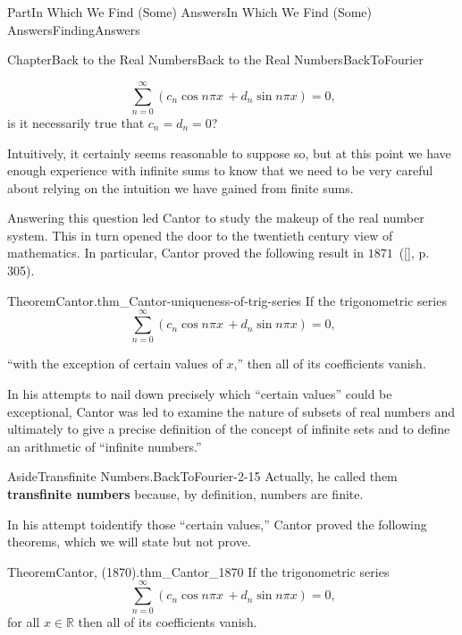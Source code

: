 \documentclass[oneside,10pt,]{book}
\newcommand{\xreffont}{\relax}
\newcommand{\terminology}[1]{\textbf{#1}}
\numberwithin{equation}{part}
\newcommand{\RR}{\mathbb {R}}
\begin{document}
\begin{partptx}{Part}{In Which We Find (Some) Answers}{}{In Which We Find (Some) Answers}{}{}{FindingAnswers}
\begin{chapterptx}{Chapter}{Back to the Real Numbers}{}{Back to the Real Numbers}{}{}{BackToFourier}
\begin{introduction}{}
\begin{equation*}
\sum_{n=0}^\infty\left(c_n\cos n\pi x\,+d_n\sin n\pi
x\right) = 0\text{,}
\end{equation*}
is it necessarily true that \(c_n=d_n=0\)?%
\par
Intuitively, it certainly seems reasonable to suppose so, but at this point we have enough experience with infinite sums to know that we need to be very careful about relying on the intuition we have gained from finite sums.%
\par
Answering this question led Cantor to study the makeup of the real number system.  This in turn opened the door to the twentieth century view of mathematics.  In particular, Cantor proved the following result in \(1871\)~(\hyperlink{jahnke03__histor_analy}{[{\xreffont 6}]}, p. 305).%
\begin{theorem}{Theorem}{Cantor.}{}{thm_Cantor-uniqueness-of-trig-series}%
%
%
%
If the trigonometric series%
\begin{equation*}
\sum_{n=0}^\infty\left(c_n\cos n\pi  x\,+d_n\sin n\pi x\right) = 0\text{,}
\end{equation*}
%
\par
``with the exception of certain values of \(x\),'' then all of its coefficients vanish.%
\end{theorem}
In his attempts to nail down precisely which ``certain values'' could be exceptional, Cantor was led to examine the nature of subsets of real numbers and ultimately to give a precise definition of the concept of infinite sets and to define an arithmetic of ``infinite numbers.''%
\begin{aside}{Aside}{Transfinite Numbers.}{BackToFourier-2-15}%
Actually, he called them \terminology{transfinite numbers} because, by definition, numbers are finite.%
\end{aside}
In his attempt toidentify those ``certain values,'' Cantor proved the following theorems, which we will state but not prove.%
\begin{theorem}{Theorem}{Cantor, (1870).}{}{thm_Cantor_1870}%
%
%
If the trigonometric series%
\begin{equation*}
\sum_{n=0}^\infty\left(c_n\cos n\pi  x\,+d_n\sin n\pi x\right) = 0\text{,}
\end{equation*}
for all \(x\in\RR\) then all of its coefficients vanish.%

\end{theorem}
\end{introduction}
\end{chapterptx}
\end{partptx}
\end{document}
